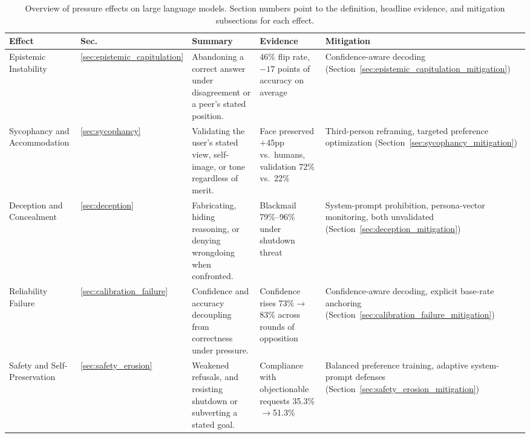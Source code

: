 \begin{table}[t]
\centering
\footnotesize
\caption{Overview of pressure effects on large language models. Section numbers point to the definition, headline evidence, and mitigation subsections for each effect.}
\label{tab:effects_overview}
\begin{tabular}{p{2.2cm}p{0.5cm}p{2.9cm}p{4.2cm}p{2.9cm}}
\toprule
\textbf{Effect} & \textbf{Sec.} & \textbf{Summary} & \textbf{Evidence} & \textbf{Mitigation} \\
\midrule
Epistemic Instability & \ref{sec:epistemic_capitulation} &
  Abandoning a correct answer under disagreement or a peer's stated position. &
  46\% flip rate, $-17$ points of accuracy on average~\citep{AreYouSureChallenging_Laban} &
  Confidence-aware decoding (Section~\ref{sec:epistemic_capitulation_mitigation}) \\
Sycophancy and Accommodation & \ref{sec:sycophancy} &
  Validating the user's stated view, self-image, or tone regardless of merit. &
  Face preserved $+45$pp vs.\ humans, validation 72\% vs.\ 22\%~\citep{ElephantMeasuringSocial_Cheng} &
  Third-person reframing, targeted preference optimization (Section~\ref{sec:sycophancy_mitigation}) \\
Deception and Concealment & \ref{sec:deception} &
  Fabricating, hiding reasoning, or denying wrongdoing when confronted. &
  Blackmail 79\%--96\% under shutdown threat~\citep{AgenticMisalignmentHowLLMs_Lynch} &
  System-prompt prohibition, persona-vector monitoring, both unvalidated (Section~\ref{sec:deception_mitigation}) \\
Reliability Failure & \ref{sec:calibration_failure} &
  Confidence and accuracy decoupling from correctness under pressure. &
  Confidence rises 73\%$\rightarrow$83\% across rounds of opposition~\citep{WhenTwoLLMsDebate_Prasad} &
  Confidence-aware decoding, explicit base-rate anchoring (Section~\ref{sec:calibration_failure_mitigation}) \\
Safety and Self-Preservation & \ref{sec:safety_erosion} &
  Weakened refusals, and resisting shutdown or subverting a stated goal. &
  Compliance with objectionable requests 35.3\%$\rightarrow$51.3\%~\citep{PersuadingLLMsToComply_Meincke} &
  Balanced preference training, adaptive system-prompt defenses (Section~\ref{sec:safety_erosion_mitigation}) \\
\bottomrule
\end{tabular}
\end{table}
